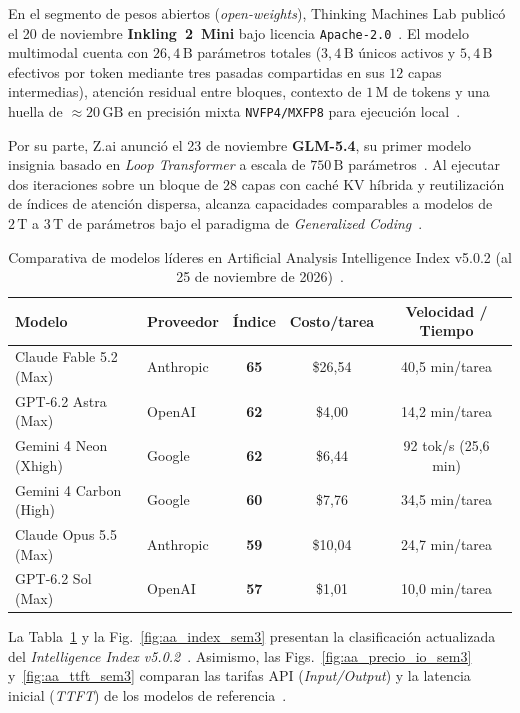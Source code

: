 \documentclass[conference,twocolumn,spanish]{IEEEtran}
\begin{document}
En el segmento de pesos abiertos (\textit{open-weights}), Thinking Machines Lab publicó el 20 de noviembre \textbf{Inkling~2~Mini} bajo licencia \texttt{Apache-2.0}~\cite{tml_inkling2mini_2026}. El modelo multimodal cuenta con $26{,}4\,\text{B}$ parámetros totales ($3{,}4\,\text{B}$ únicos activos y $5{,}4\,\text{B}$ efectivos por token mediante tres pasadas compartidas en sus $12$ capas intermedias), atención residual entre bloques, contexto de $1\,\text{M}$ de tokens y una huella de $\approx 20\,\text{GB}$ en precisión mixta \texttt{NVFP4/MXFP8} para ejecución local~\cite{tml_inkling2mini_2026}.

Por su parte, Z.ai anunció el 23 de noviembre \textbf{GLM-5.4}, su primer modelo insignia basado en \textit{Loop Transformer} a escala de $750\,\text{B}$ parámetros~\cite{zai_glm54_2026}. Al ejecutar dos iteraciones sobre un bloque de $28$ capas con caché KV híbrida y reutilización de índices de atención dispersa, alcanza capacidades comparables a modelos de $2\,\text{T}$ a $3\,\text{T}$ de parámetros bajo el paradigma de \textit{Generalized Coding}~\cite{zai_glm54_2026}.

\begin{table}[htbp]
\centering
\caption{Comparativa de modelos líderes en Artificial Analysis Intelligence Index v5.0.2 (al 25 de noviembre de 2026)~\cite{aa_index_2026}.}
\label{tab:aa_modelos_sem3}
\scriptsize
\begin{tabularx}{\columnwidth}{@{}l l c c c@{}}
\toprule
\textbf{Modelo} & \textbf{Proveedor} & \textbf{Índice} & \textbf{Costo/tarea} & \textbf{Velocidad / Tiempo} \\
\midrule
Claude Fable 5.2 (Max) & Anthropic & \textbf{65} & \$26,54 & 40,5 min/tarea \\
GPT-6.2 Astra (Max)    & OpenAI    & \textbf{62} & \$4,00  & 14,2 min/tarea \\
Gemini 4 Neon (Xhigh)  & Google    & \textbf{62} & \$6,44  & 92 tok/s (25,6 min) \\
Gemini 4 Carbon (High) & Google    & \textbf{60} & \$7,76  & 34,5 min/tarea \\
Claude Opus 5.5 (Max)  & Anthropic & \textbf{59} & \$10,04 & 24,7 min/tarea \\
GPT-6.2 Sol (Max)      & OpenAI    & \textbf{57} & \$1,01  & 10,0 min/tarea \\
\bottomrule
\end{tabularx}
\end{table}

La Tabla~\ref{tab:aa_modelos_sem3} y la Fig.~\ref{fig:aa_index_sem3} presentan la clasificación actualizada del \textit{Intelligence Index v5.0.2}~\cite{aa_index_2026}. Asimismo, las Figs.~\ref{fig:aa_precio_io_sem3} y~\ref{fig:aa_ttft_sem3} comparan las tarifas API (\textit{Input/Output}) y la latencia inicial (\textit{TTFT}) de los modelos de referencia~\cite{aa_index_2026}.
\end{document}
